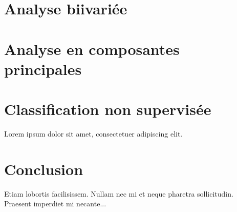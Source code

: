 \documentclass[12pt, a4paper]{article}
\begin{document}
\section{Analyse biivariée}

\section{Analyse en composantes principales}

\section{Classification non supervisée }
       
Lorem ipsum dolor sit amet, consectetuer adipiscing elit.  

\section{Conclusion }
Etiam lobortis facilisissem.  Nullam nec mi et neque pharetra 
sollicitudin.  Praesent imperdiet mi necante...
         
\end{document}
